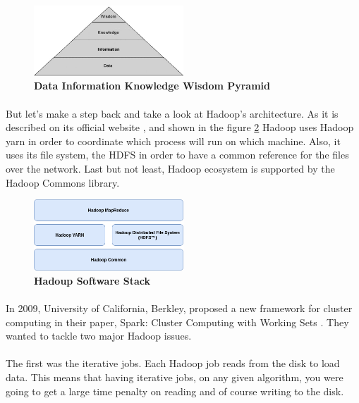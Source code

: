\begin{figure}[h]
	\centering
	\includegraphics[width=0.5\textwidth]{images/DIKW.png}
	\caption{\bfseries Data Information Knowledge Wisdom Pyramid \cite{TheWisdomHierachy:7}}
	\label{dikw}
\end{figure}
\paragraph{} But let's make a step back and take a look at Hadoop's architecture. As it is described on its official website \cite{Hadoop:9}, and shown in the figure \ref{hadoopStack} Hadoop uses Hadoop yarn in order to coordinate which process will run on which machine. Also, it uses its file system, the HDFS in order to have a common reference for the files over the network. Last but not least, Hadoop ecosystem is supported by the Hadoop Commons library. \\

\begin{figure}[h]
	\centering
	\includegraphics[width=0.5\textwidth]{images/hadoop-stack.png}
	\caption{\bfseries Hadoup Software Stack}
	\label{hadoopStack}
\end{figure}

\paragraph{} In 2009, University of California, Berkley, proposed a new framework for cluster computing in their paper, Spark: Cluster Computing with Working Sets \cite{Zaharia:2010:SCC:1863103.1863113}. They wanted to tackle two major Hadoop issues. 

\paragraph{}The first was the iterative jobs. Each Hadoop job reads from the disk to load data. This means that having iterative jobs, on any given algorithm, you were going to get a large time penalty on reading and of course writing to the disk. 

